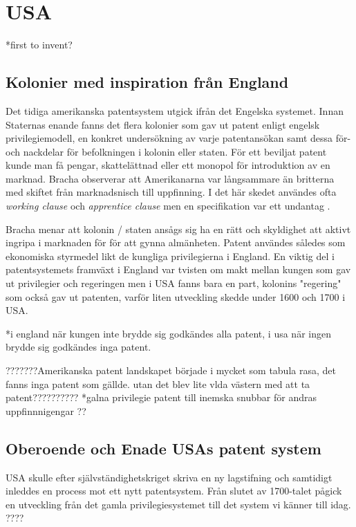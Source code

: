\section{USA} 
*first to invent?

\subsection{Kolonier med inspiration från England}

Det tidiga amerikanska patentsystem utgick ifrån det Engelska systemet. Innan Staternas enande fanns det
flera kolonier som gav ut patent enligt engelsk privilegiemodell, en konkret undersökning av varje
patentansökan samt dessa för- och nackdelar för befolkningen i kolonin eller staten. För ett beviljat
patent kunde man få pengar, skattelättnad eller ett monopol för introduktion av en marknad. Bracha
observerar att Amerikanarna var långsammare än britterna med skiftet från marknadsnisch till
uppfinning\cite{bracha}. I det här skedet användes ofta \emph{working clause} och \emph{apprentice
clause} men en specifikation var ett undantag \cite{bracha}.

Bracha menar att kolonin / staten ansågs sig ha en rätt och skyldighet att aktivt ingripa i marknaden
för för att gynna almänheten\cite{bracha}. Patent användes således som ekonomiska styrmedel likt de
kungliga privilegierna i England. En viktig del i patentsystemets framväxt i England var tvisten om makt
mellan kungen som gav ut privilegier och regeringen men i USA fanns bara en part, kolonins "regering"
som också gav ut patenten, varför liten utveckling skedde under 1600 och 1700 i USA.

*i england när kungen inte brydde sig godkändes alla patent, i usa när ingen brydde sig godkändes inga
patent.

???????Amerikanska patent landskapet började i mycket som tabula rasa, det fanns inga patent som gällde.
utan det blev lite vlda västern med att ta patent?????????? 
*galna privilegie patent till inemska
snubbar för andras uppfinnnigengar ??

\subsection{Oberoende och Enade USAs patent system}

USA skulle efter självständighetskriget skriva en ny lagstifning och samtidigt inleddes en process
mot ett nytt patentsystem. Från slutet av 1700-talet pågick en utveckling från det gamla privilegiesystemet till det system vi känner till idag.
????

